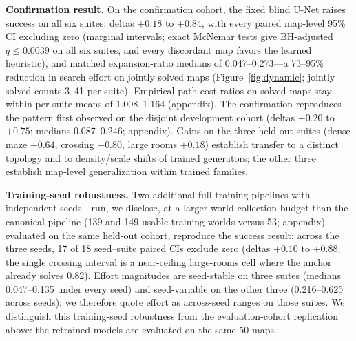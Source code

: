 \documentclass[letterpaper]{article} %
\begin{document}
\textbf{Confirmation result.} On the confirmation cohort, the fixed blind U-Net raises success on all six suites: deltas $+0.18$ to $+0.84$, with every paired map-level 95\% CI excluding zero (marginal intervals; exact McNemar tests give BH-adjusted $q \leq 0.0039$ on all six suites, and every discordant map favors the learned heuristic), and matched expansion-ratio medians of 0.047--0.273---a 73--95\% reduction in search effort on jointly solved maps (Figure~\ref{fig:dynamic}; jointly solved counts 3--41 per suite). Empirical path-cost ratios on solved maps stay within per-suite means of 1.008--1.164 (appendix). The confirmation reproduces the pattern first observed on the disjoint development cohort (deltas $+0.20$ to $+0.75$; medians 0.087--0.246; appendix). Gains on the three held-out suites (dense maze $+0.64$, crossing $+0.80$, large rooms $+0.18$) establish transfer to a distinct topology and to density/scale shifts of trained generators; the other three establish map-level generalization within trained families.

\textbf{Training-seed robustness.} Two additional full training pipelines with independent seeds---run, we disclose, at a larger world-collection budget than the canonical pipeline (139 and 149 usable training worlds versus 53; appendix)---evaluated on the same held-out cohort, reproduce the success result: across the three seeds, 17 of 18 seed--suite paired CIs exclude zero (deltas $+0.10$ to $+0.88$; the single crossing interval is a near-ceiling large-rooms cell where the anchor already solves 0.82). Effort magnitudes are seed-stable on three suites (medians 0.047--0.135 under every seed) and seed-variable on the other three (0.216--0.625 across seeds); we therefore quote effort as across-seed ranges on those suites. We distinguish this training-seed robustness from the evaluation-cohort replication above: the retrained models are evaluated on the same 50 maps.
\end{document}
